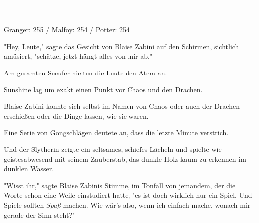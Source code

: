 {--------------------------------------------------------------------------------------------------------------------------------------------

Granger: 255 / Malfoy: 254 / Potter: 254

"Hey, Leute," sagte das Gesicht von Blaise Zabini auf den Schirmen, sichtlich amüsiert, "schätze, jetzt hängt alles von mir ab."

Am gesamten Seeufer hielten die Leute den Atem an.

Sunshine lag um exakt einen Punkt vor Chaos und den Drachen.

Blaise Zabini konnte sich selbst im Namen von Chaos oder auch der Drachen erschießen oder die Dinge lassen, wie sie waren.

Eine Serie von Gongschlägen deutete an, dass die letzte Minute verstrich.

Und der Slytherin zeigte ein seltsames, schiefes Lächeln und spielte wie geistesabwesend mit seinem Zauberstab, das dunkle Holz kaum zu erkennen im dunklen Wasser.

"Wisst ihr," sagte Blaise Zabinis Stimme, im Tonfall von jemandem, der die Worte schon eine Weile einstudiert hatte, "es ist doch wirklich nur ein Spiel. Und Spiele sollten \emph{Spaß} machen. Wie wär's also, wenn ich einfach mache, wonach mir gerade der Sinn steht?"

}
